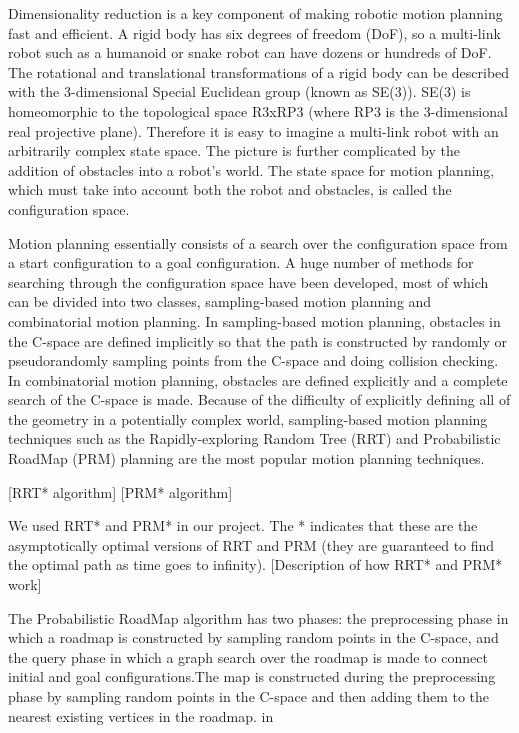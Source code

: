 \documentclass[12pt]{article}
\begin{document}
\maketitle

Dimensionality reduction is a key component of making robotic motion planning
fast and efficient. A rigid body has six degrees of freedom (DoF), so a
multi-link robot such as a humanoid or snake robot can have dozens or hundreds
of DoF. The rotational and translational transformations of a rigid body can be
described with the 3-dimensional Special Euclidean group (known as SE(3)).
SE(3) is homeomorphic to the topological space R3xRP3 (where RP3 is the
3-dimensional real projective plane). Therefore it is easy to imagine a
multi-link robot with an arbitrarily complex state space. The picture is
further complicated by the addition of obstacles into a robot's world. The
state space for motion planning, which must take into account both the robot
and obstacles, is called the configuration space. 

Motion planning essentially consists of a search over the configuration space
from a start configuration to a goal configuration. A huge number of methods
for searching through the configuration space have been developed, most of
which can be divided into two classes, sampling-based motion planning and
combinatorial motion planning. In sampling-based motion planning, obstacles in
the C-space are defined implicitly so that the path is constructed by randomly
or pseudorandomly sampling points from the C-space and doing collision
checking. In combinatorial motion planning, obstacles are defined explicitly
and a complete search of the C-space is made. Because of the difficulty of
explicitly defining all of the geometry in a potentially complex world,
sampling-based motion planning techniques such as the Rapidly-exploring Random
Tree (RRT) and Probabilistic RoadMap (PRM) planning are the most popular motion
planning techniques.

[RRT* algorithm]
[PRM* algorithm]

We used RRT* and PRM* in our project. The * indicates that these are the
asymptotically optimal versions of RRT and PRM (they are guaranteed to find the
optimal path as time goes to infinity). [Description of how RRT* and PRM* work]

The Probabilistic RoadMap algorithm has two phases: the preprocessing phase in which a roadmap is constructed by sampling random points in the C-space, and the query phase in which a graph search over the roadmap is made to connect initial and goal configurations.The map is constructed during the preprocessing phase by sampling random points in the C-space and then adding them to the nearest existing vertices in the roadmap. in 
\end{document}

